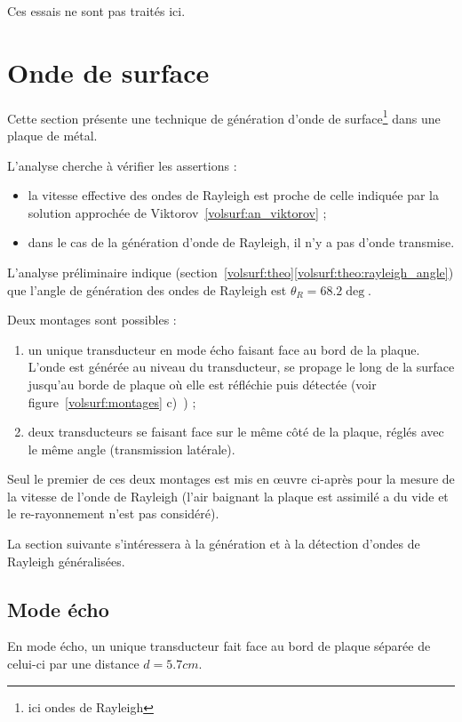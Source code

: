 Ces essais ne sont pas traités ici.

\section{Onde de surface}

Cette section présente une technique de génération d'onde de surface\footnote{ici ondes de Rayleigh} dans une plaque de métal.

L'analyse cherche à vérifier les assertions :
\begin{itemize}
    \item la vitesse effective des ondes de Rayleigh est proche de celle indiquée par la solution approchée de Viktorov~\eqref{volsurf:an_viktorov} ;
    \item dans le cas de la génération d'onde de Rayleigh, il n'y a pas d'onde transmise.
\end{itemize}

L'analyse préliminaire indique (section~\ref{volsurf:theo}\ref{volsurf:theo:rayleigh_angle}) que l'angle de génération des ondes de Rayleigh est $\theta_R = 68.2\deg$.

Deux montages sont possibles :
\begin{enumerate}
    \item un unique transducteur en mode écho faisant face au bord de la plaque. L'onde est générée au niveau du transducteur, se propage le long de la surface jusqu'au borde de plaque où elle est réfléchie puis détectée (voir figure~\ref{volsurf:montages} c)~) ;
    \item deux transducteurs se faisant face sur le même côté de la plaque, réglés avec le même angle (transmission latérale).
\end{enumerate}

Seul le premier de ces deux montages est mis en œuvre ci-après pour la mesure de la vitesse de l'onde de Rayleigh (l'air baignant la plaque est assimilé a du vide et le re-rayonnement n'est pas considéré).

La section suivante s'intéressera à la génération et à la détection d'ondes de Rayleigh généralisées.

\subsection{Mode écho}

En mode écho, un unique transducteur fait face au bord de plaque séparée de celui-ci par une distance $d = 5.7cm$.

